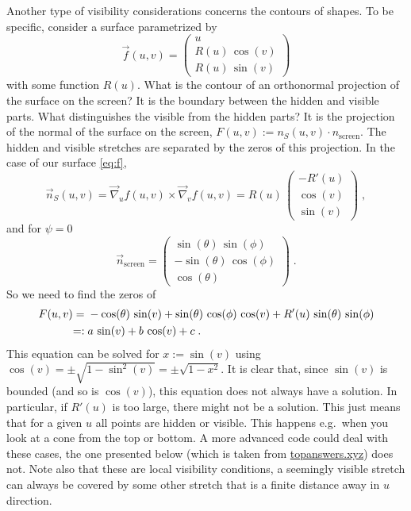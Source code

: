 \documentclass[a4paper,fleqn]{ltxdoc}
\begin{document}
Another type of visibility considerations concerns the contours of shapes. To be
specific, consider a surface parametrized by
\begin{equation}\label{eq:f}
 \vec f(u,v)=\begin{pmatrix}
 u\\ R(u)\,\cos (v)\\ R(u)\,\sin (v)
 \end{pmatrix}
\end{equation}
with some function $R(u)$. What is the contour of an orthonormal projection of the
surface on the screen? It is the boundary between the hidden and visible parts.
What distinguishes the visible from the hidden parts? It is the projection of
the normal of the surface on the screen, $F(u,v):=n_S(u,v)\cdot 
n_\mathrm{screen}$. The hidden and visible stretches are separated by the zeros
of this projection. In the case of our surface \eqref{eq:f},
\begin{equation}
  \vec n_S(u,v)=\vec\nabla_u f(u,v)\times \vec\nabla_v f(u,v)
 =R(u)\,\begin{pmatrix}
 	-R'(u)\\ \cos (v)\\ \sin (v)
 \end{pmatrix}\;,
\end{equation}
and for $\psi=0$
\begin{equation}
 \vec n_\mathrm{screen}=\begin{pmatrix}
 	\sin(\theta)\,\sin (\phi)\\
	-\sin (\theta )\,\cos(\phi)\\
	\cos (\theta)
  \end{pmatrix}\;.
\end{equation}
So we need to find the zeros of 
\begin{align}
 F(u,v)={}&{}-\cos (\theta)\,\sin (v)+
 \sin (\theta )\,\cos(\phi)\,\cos (v)+ R'(u)\,\sin(\theta)\,\sin (\phi)\notag\\
 =:{}&{}a\,\sin (v)+b\,\cos(v)+c\;.\label{eq:vcrit}
\end{align} 
This equation can be solved for $x:=\sin (v)$ using 
$\cos(v)=\pm\sqrt{1-\sin^2(v)}=\pm\sqrt{1-x^2}$. It is clear that, since  $\sin
(v)$ is bounded (and so is $\cos(v)$), this equation does not always have a
solution. In particular, if $R'(u)$ is too large, there might not be a solution.
This just means that for a given $u$ all points are hidden or visible. This
happens e.g.\ when you look at a cone from the top or bottom. A more advanced
code could deal with these cases, the one presented below (which is taken from
\href{https://topanswers.xyz/tex?q=1218\#a1447}{topanswers.xyz}) does not. Note also
that these are local visibility conditions, a seemingly visible stretch can
always be covered by some other stretch that is a finite distance away in $u$
direction.
\end{document}
